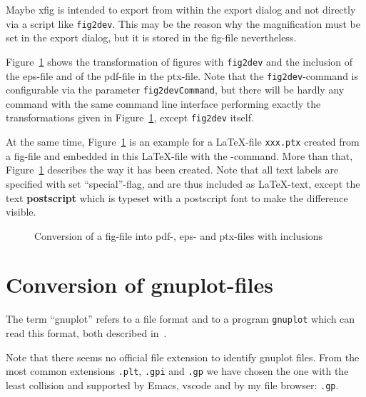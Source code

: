 Maybe xfig is intended to export from within the export dialog 
and not directly via a script like \texttt{fig2dev}. 
This may be the reason 
why the magnification must be set in the export dialog, 
but it is stored in the fig-file nevertheless. 

Figure~\ref{fig:fig2dev} shows the transformation 
of figures with \texttt{fig2dev} 
and the inclusion of the eps-file and of the pdf-file in the ptx-file. 
Note that the \texttt{fig2dev}-command is configurable 
via the parameter \texttt{fig2devCommand}, 
but there will be hardly any command with the same command line interface 
performing exactly the transformations given in Figure~\ref{fig:fig2dev}, 
except \texttt{fig2dev} itself. 

At the same time, Figure~\ref{fig:fig2dev} is an example 
for a \LaTeX-file \texttt{xxx.ptx} created from a fig-file 
and embedded in this \LaTeX-file 
with the -command. 
More than that, 
Figure~\ref{fig:fig2dev} describes the way it has been created. 
Note that all text labels are specified with set ``special''-flag, 
and are thus included as \LaTeX-text, 
except the text \textbf{\tiny postscript} 
which is typeset with a postscript font to make the difference visible. 


\begin{figure}[htb]
\centering
{}
\caption{\label{fig:fig2dev}Conversion of a fig-file 
into pdf-, eps- and ptx-files with inclusions}
\end{figure}


\section{Conversion of gnuplot-files}\label{sec:gnuplot2dev}

The term ``gnuplot'' refers to a file format
and to a program \texttt{gnuplot}
which can read this format, both described in~\cite{GnuPlot6_0}. 

Note that there seems no official file extension 
to identify gnuplot files. 
From the most common extensions \texttt{.plt}, \texttt{.gpi} and \texttt{.gp} 
we have chosen the one with the least collision 
and supported by Emacs, vscode and by my file browser: \texttt{.gp}. 

